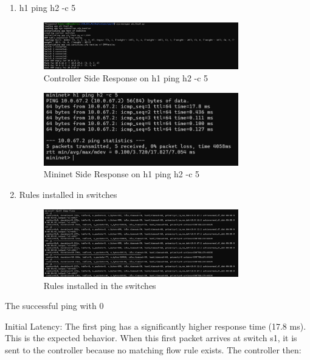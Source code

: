 \documentclass[12pt]{article}
\begin{document}
\begin{enumerate}
    \item h1 ping h2 -c 5
    \begin{figure}[h!]
        \centering
        \includegraphics[width=0.8\textwidth]{p3_ping_c.jpeg}
        \caption{Controller Side Response on h1 ping h2 -c 5}
    \end{figure}

    \begin{figure}[h!]
        \centering
        \includegraphics[width=0.8\textwidth]{p3_ping_m.jpeg}
        \caption{Mininet Side Response on h1 ping h2 -c 5}
    \end{figure}
    \item Rules installed in switches
    \begin{figure}[h!]
        \centering
        \includegraphics[width=0.8\textwidth]{p3_rules.jpeg}
        \caption{Rules installed in the switches}
    \end{figure}
\end{enumerate}

The successful ping with 0%

Initial Latency: The first ping has a significantly higher response time (17.8 ms). This is the expected behavior. When this first packet arrives at switch s1, it is sent to the controller because no matching flow rule exists. The controller then:
\end{document}
